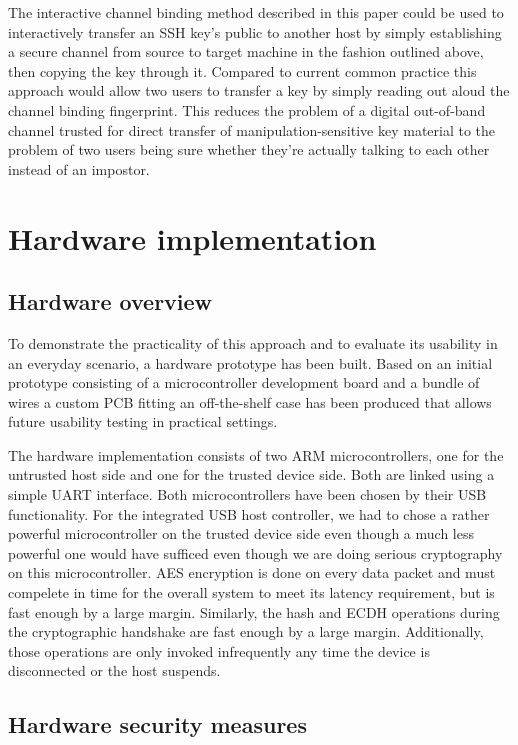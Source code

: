 \documentclass[12pt,a4paper,notitlepage]{article}
\begin{document}
The interactive channel binding method described in this paper could be used to interactively transfer an SSH key's
public to another host by simply establishing a secure channel from source to target machine in the fashion outlined
above, then copying the key through it. Compared to current common practice this approach would allow two users to
transfer a key by simply reading out aloud the channel binding fingerprint. This reduces the problem of a digital
out-of-band channel trusted for direct transfer of manipulation-sensitive key material to the problem of two users being
sure whether they're actually talking to each other instead of an impostor.

\section{Hardware implementation}
\subsection{Hardware overview}
To demonstrate the practicality of this approach and to evaluate its usability in an everyday scenario, a hardware
prototype has been built. Based on an initial prototype consisting of a microcontroller development board and a bundle
of wires a custom PCB fitting an off-the-shelf case has been produced that allows future %
usability testing in practical settings.

The hardware implementation consists of two ARM microcontrollers, one for the untrusted host side and one for the
trusted device side. Both are linked using a simple UART interface. Both microcontrollers have been chosen by their USB
functionality. For the integrated USB host controller, we had to chose a rather powerful microcontroller on the trusted
device side even though a much less powerful one would have sufficed even though we are doing serious cryptography on
this microcontroller. AES encryption is done on every data packet and must compelete in time for the overall system to
meet its latency requirement, %
but is fast enough by a large margin. %
Similarly, the hash and ECDH operations during the cryptographic handshake are fast enough by a large margin. %
Additionally, those operations are only invoked infrequently any time the device is disconnected or the host suspends.

\subsection{Hardware security measures}
\end{document}
